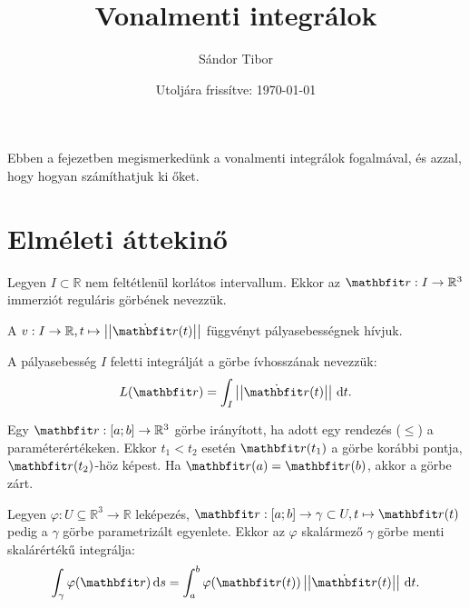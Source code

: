 \documentclass[lang=magyar]{math-handout}
\title{Vonalmenti integrálok}
\date{Utoljára frissítve: \today}
\author{Sándor Tibor}
\begin{document}
\allowdisplaybreaks

\maketitle

\vspace{1em}

\begin{summary}
  Ebben a fejezetben megismerkedünk a vonalmenti integrálok fogalmával, és
  azzal, hogy hogyan számíthatjuk ki őket.
\end{summary}

\vspace{-1em}

\section{Elméleti áttekinő}

\vspace{1em}

\begin{definition}
  Legyen $I \subset \mathbb R$ nem feltétlenül korlátos intervallum. Ekkor az
  $\rvec r : I \rightarrow \mathbb R^3$ immerziót reguláris görbének nevezzük.
\end{definition}

\begin{definition}
  A $v: I \rightarrow \mathbb R, t \mapsto \norma{\dot{\rvec r}(t)}$
  függvényt pályasebességnek hívjuk.

  A pályasebesség $I$ feletti integrálját a görbe ívhosszának nevezzük:
  \[
    L(\rvec r) = \int_I \norma{\dot{\rvec r}(t)} \, \diff t
    \text.
  \]

\end{definition}

\vfill

\begin{definition}
  Egy $\rvec r: [a;b] \rightarrow \mathbb R^3$ görbe irányított, ha adott egy
  rendezés ($\leq$) a paraméterértékeken. Ekkor $t_1 < t_2$ esetén
  $\rvec r(t_1)$ a görbe korábbi pontja, $\rvec r(t_2)$-höz képest. Ha
  $\rvec r(a) = \rvec r(b)$, akkor a görbe zárt.
\end{definition}

\vfill

\begin{definition}
  Legyen $\varphi: U \subseteq \mathbb R^3 \rightarrow \mathbb R$ leképezés,
  $\rvec r: [a;b] \rightarrow \gamma \subset U, t \mapsto \rvec r(t)$ pedig a
  $\gamma$ görbe parametrizált egyenlete. Ekkor az $\varphi$ skalármező $\gamma$
  görbe menti skalárértékű integrálja:
  \[
    \int_\gamma \varphi(\rvec r) \, \diff s =
    \int_a^b \varphi(\rvec r(t)) \norma{\dot{\rvec r}(t)} \, \diff t
    \text.
  \]
\end{definition}
\end{document}
